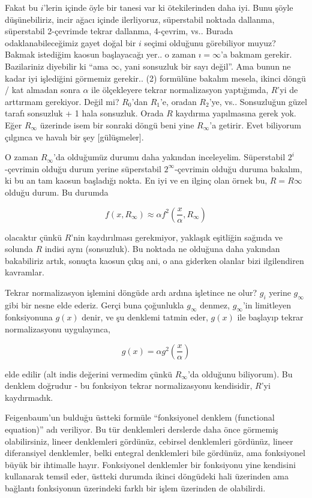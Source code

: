 \documentclass[12pt,fleqn]{article}\usepackage{../../common}
\begin{document}
Fakat bu $i$'lerin içinde öyle bir tanesi var ki ötekilerinden daha
iyi. Bunu şöyle düşünebiliriz, incir ağacı içinde ilerliyoruz, süperstabil
noktada dallanma, süperstabil 2-çevrimde tekrar dallanma, 4-çevrim,
vs.. Burada odaklanabileceğimiz gayet doğal bir $i$ seçimi olduğunu
görebiliyor muyuz? Bakmak istediğim kaosun başlayacağı yer.. o zaman $ı =
\infty$'a bakmam gerekir. Bazilariniz diyebilir ki ``ama $\infty$,
yani sonsuzluk bir sayı değil''. Ama bunun ne kadar iyi işlediğini görmemiz
gerekir..  (2) formülüne bakalım mesela, ikinci döngü / kat almadan sonra
$\alpha$ ile ölçekleyere tekrar normalizasyon yaptığımda, $R$'yi de
arttırmam gerekiyor. Değil mi? $R_0$'dan $R_1$'e, oradan $R_2$'ye,
vs.. Sonsuzluğun güzel tarafı sonsuzluk + 1 hala sonsuzluk. Orada $R$
kaydırma yapılmasına gerek yok. Eğer $R_\infty$ üzerinde isem bir sonraki döngü
beni yine $R_\infty$'a getirir. Evet biliyorum çılgınca ve havalı bir şey
[gülüşmeler].

O zaman $R_\infty$'da olduğumüz durumu daha yakından inceleyelim. Süperstabil
$2^i$-çevrimin olduğu durum yerine süperstabil $2^\infty$-çevrimin olduğu
duruma bakalım, ki bu an tam kaosun başladığı nokta. En iyi ve en ilginç olan
örnek bu, $R = R\infty$ olduğu durum. Bu durumda

$$
f(x,R_\infty) \approx \alpha f^2(\frac{x}{\alpha}, R_\infty)
$$

olacaktır çünkü $R$'nin kaydırılması gerekmiyor, yaklaşık eşitliğin sağında ve
solunda $R$ indisi aynı (sonsuzluk). Bu noktada ne olduğuna daha yakından
bakabiliriz artık, sonuçta kaosun çıkış ani, o ana giderken olanlar bizi
ilgilendiren kavramlar.

Tekrar normalizasyon işlemini döngüde ardı ardına işletince ne olur? $g_i$
yerine $g_\infty$ gibi bir nesne elde ederiz. Gerçi buna çoğunlukla $g_\infty$
denmez, $g_\infty$'in limitleyen fonksiyonuna $g(x)$ denir, ve şu denklemi
tatmin eder, $g(x)$ ile başlayıp tekrar normalizasyonu uygulayınca,

$$
g(x) = \alpha g^2(\frac{x}{\alpha})
$$

elde edilir (alt indis değerini vermedim çünkü $R_\infty$'da olduğunu
biliyorum). Bu denklem doğrudur - bu fonksiyon tekrar normalizasyonu
kendisidir, $R$'yi kaydırmadık.

Feigenbaum'un bulduğu üstteki formüle ``fonksiyonel denklem (functional
equation)'' adı veriliyor. Bu tür denklemleri derslerde daha önce görmemiş
olabilirsiniz, lineer denklemleri gördünüz, cebirsel denklemleri gördünüz,
lineer diferansiyel denklemler, belki entegral denklemleri bile gördünüz, ama
fonksiyonel büyük bir ihtimalle hayır. Fonksiyonel denklemler bir fonksiyonu
yine kendisini kullanarak temsil eder, üstteki durumda ikinci döngüdeki hali
üzerinden ama bağlantı fonksiyonun üzerindeki farklı bir işlem üzerinden de
olabilirdi. 
\end{document}
